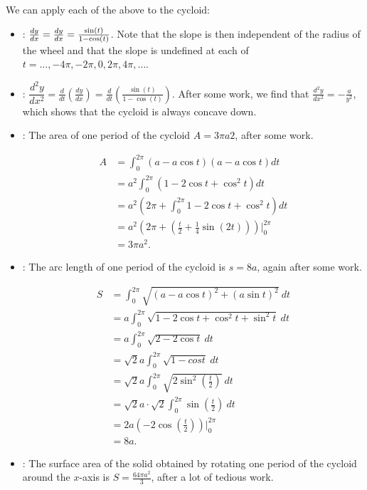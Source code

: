 We can apply each of the above to the cycloid:
\begin{itemize}
    \item {}: \(\frac{dy}{dx} = \frac{dy}{dx} = \frac{\sin(t)}{1 - \cos(t)}\). Note that the slope is then independent of the radius of the wheel and
    that the slope is undefined at each of \(t = \dots, -4\pi, -2\pi, 0, 2\pi, 4\pi, \dots\). 
    \item {}: \(\dfrac{d^{2}y}{dx^{2}} = \frac{d}{dt}\left(\frac{dy}{dx}\right) = \frac{d}{dt}\left(\frac{\sin(t)}{1 - \cos(t)}\right)\). After some work, we find that \(\frac{d^{2}y}{dx^{2}} = -\frac{a}{y^{2}}\), which shows that the cycloid is always concave down.
    \item {}: The area of one period of the cycloid \(A = 3\pi a2\), after some work.

    \begin{align*}
        A &= \int_{0}^{2\pi} (a - a \cos t)(a - a\cos t) dt \\
        &= a^{2} \int_{0}^{2\pi} (1 - 2\cos t + \cos^{2} t) dt \\
        &= a^{2} \left(2\pi + \int_{0}^{2\pi} 1 - 2\cos t + \cos^{2} t \right) dt \\
        &= a^{2}\left(2\pi + \left(\frac{t}{2} + \frac{1}{4}\sin(2t)\right)\right)\bigg|_{0}^{2\pi} \\
        &= 3\pi a^{2}.
    \end{align*}

    \item {}: The arc length of one period of the cycloid is \(s = 8a\), again after some work.

    \begin{align*}
        S &= \int_{0}^{2\pi} \sqrt{(a- a \cos t)^{2} + (a \sin t)^{2}} \ dt \\
        &= a \int_{0}^{2\pi} \sqrt{1 - 2\cos t + \cos^{2} t + \sin^{2} t} \ dt \\
        &= a \int_{0}^{2\pi} \sqrt{2 - 2\cos t} \ dt \\
        &= \sqrt{2}a \int_{0}^{2\pi} \sqrt{1 - cost} \ dt \\
        &= \sqrt{2}a \int_{0}^{2\pi} \sqrt{2\sin^{2}\left(\frac{t}{2}\right)} \ dt \\
        &= \sqrt{2}a \cdot \sqrt{2} \int_{0}^{2\pi} \sin\left(\frac{t}{2}\right) \ dt \\
        &= 2a\left(-2 \cos\left(\frac{t}{2}\right)\right)\bigg|_{0}^{2\pi} \\ 
        &= 8a.
    \end{align*}

    \item {}: The surface area of the solid obtained by rotating one period of the cycloid around the \(x\)-axis is \(S = \frac{64\pi a^{2}}{3}\), after a lot of tedious work.
\end{itemize}
